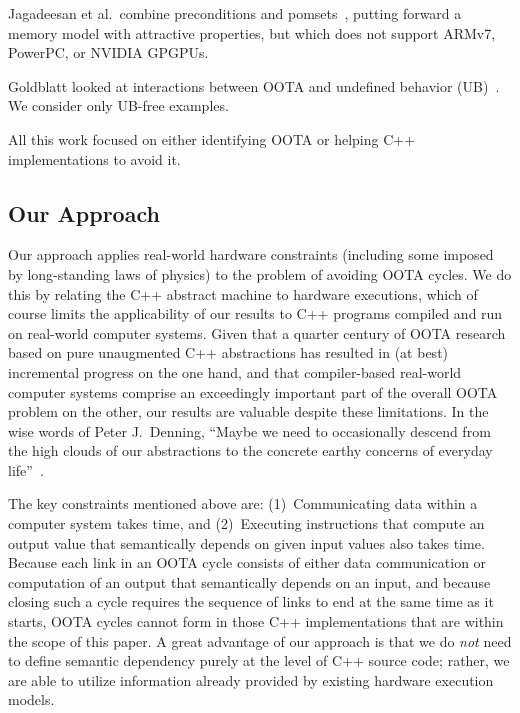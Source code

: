 Jagadeesan et al.~combine preconditions and
pomsets~\cite{RadhaJagadeesan2020OOTApomsetsPreconditions}, putting forward
a memory model with attractive properties, but which does not support
ARMv7, PowerPC, or NVIDIA GPGPUs.

Goldblatt looked at interactions between OOTA and
undefined behavior (UB)~\cite{DavidGoldblatt2019NoElegantOOTAfix}.
We consider only UB-free examples.

All this work focused on either identifying OOTA or helping C++
implementations to avoid it.

\subsection{Our Approach}
\label{sec:Our Approach}

Our approach applies real-world hardware constraints (including some
imposed by long-standing laws of physics) to the problem of avoiding
OOTA cycles.
We do this by relating the C++ abstract machine to hardware executions,
which of course limits the applicability of our results to C++ programs
compiled and run on real-world computer systems.
Given that a quarter century of OOTA research based on pure unaugmented
C++ abstractions has resulted in (at best) incremental progress on the
one hand, and that
compiler-based real-world computer systems comprise an exceedingly
important part of the overall OOTA problem on the other, our results
are valuable despite these limitations.
In the wise words of Peter J.~Denning, ``Maybe we need to occasionally
descend from the high clouds of our abstractions to the concrete earthy
concerns of everyday life''~\cite{PeterJDenning2025Abstraction}.

The key constraints mentioned above are:
(1)~Communicating data within a computer system takes time, and
(2)~Executing instructions that compute an output value that semantically
depends on given input values also takes time.
Because each link in an OOTA cycle consists of either data communication
or computation of an output that semantically depends on an input,
and because closing such a cycle requires the sequence of links
to end at the same time as it
starts, OOTA cycles cannot form in those C++ implementations that are
within the scope of this paper.
A great advantage of our approach is that we do \emph{not} need to define
semantic dependency purely at the level of C++ source code;
rather, we are able to utilize information already provided by existing
hardware execution models.

